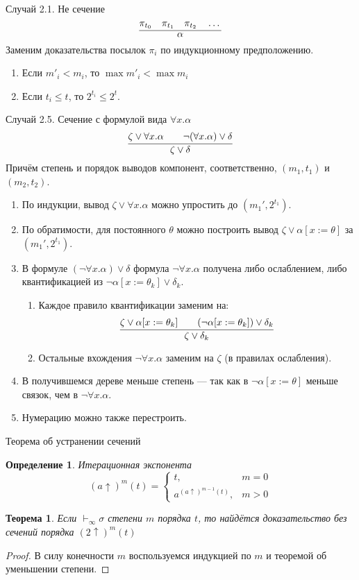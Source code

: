 \documentclass[aspectratio=169]{beamer}
\newtheorem{thm}{Теорема}[section]
\newtheorem{dfn}{Определение}[section]
\begin{document}
\begin{frame}{Случай 2.1. Не сечение}
$$\infer{\alpha}{\pi_{t_0}\quad\pi_{t_1}\quad\pi_{t_2}\quad\dots}$$
Заменим доказательства посылок $\pi_i$ по индукционному предположению.

\begin{enumerate}
\item Если $m'_i < m_i$, то $\max m'_i < \max m_i$
\item Если $t_i \le t$, то $2^{t_i} \le 2^t$.
\end{enumerate}
\end{frame}

\begin{frame}{Случай 2.5. Сечение с формулой вида $\forall x.\alpha$}
$$\infer{\zeta\vee\delta}{\zeta\vee\forall x.\alpha\quad\quad\neg(\forall x.\alpha)\vee\delta}$$
Причём степень и порядок выводов компонент, соответственно, $(m_1,t_1)$ и $(m_2,t_2)$.
\begin{enumerate}
\item По индукции, вывод $\zeta\vee\forall x.\alpha$ можно упростить до $(m_1',2^{t_1})$.
\item По обратимости, для постоянного $\theta$ можно построить вывод $\zeta\vee\alpha[x := \theta]$ за $(m_1',2^{t_1})$.
\item В формуле $(\neg \forall x. \alpha)\vee\delta$ формула $\neg\forall x.\alpha$ получена
либо ослаблением, либо квантификацией из $\neg\alpha[x := \theta_k]\vee\delta_k$. 
\begin{enumerate}
\item Каждое правило квантификации заменим на:
$$\infer{\zeta\vee\delta_k}{\zeta\vee\alpha[x := \theta_k]\quad\quad(\neg\alpha[x := \theta_k])\vee\delta_k}$$
\item Остальные вхождения $\neg\forall x.\alpha$ заменим на $\zeta$ (в правилах ослабления).
\end{enumerate}
\item В получившемся дереве меньше степень --- так как в $\neg\alpha[x := \theta]$ меньше связок, чем в $\neg\forall x.\alpha$.
\item Нумерацию можно также перестроить.
\end{enumerate}
\end{frame}

\begin{frame}{Теорема об устранении сечений}
\begin{dfn}Итерационная экспонента
$$(a\uparrow)^m(t) = 
  \left\{
    \begin{array}{ll}     t,&m=0\\
                          a^{(a\uparrow)^{m-1}(t)},&m > 0
    \end{array}
  \right.
$$
\end{dfn}
\begin{thm}Если $\vdash_\infty\sigma$ степени $m$ порядка $t$, то найдётся доказательство без сечений
порядка $(2\uparrow)^m(t)$
\end{thm}
\begin{proof}
В силу конечности $m$ воспользуемся индукцией по $m$ и теоремой об уменьшении степени.
\end{proof}
\end{frame}
\end{document}
